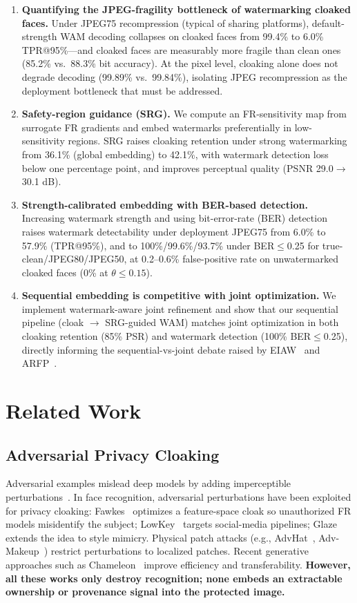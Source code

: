 \documentclass[preprint,12pt]{elsarticle}
\begin{document}
\begin{enumerate}
\item \textbf{Quantifying the JPEG-fragility bottleneck of watermarking cloaked faces.} Under JPEG75 recompression (typical of sharing platforms), default-strength WAM decoding collapses on cloaked faces from 99.4\% to 6.0\% TPR@95\%---and cloaked faces are measurably more fragile than clean ones (85.2\% vs.\ 88.3\% bit accuracy). At the pixel level, cloaking alone does not degrade decoding (99.89\% vs.\ 99.84\%), isolating JPEG recompression as the deployment bottleneck that must be addressed.
\item \textbf{Safety-region guidance (SRG).} We compute an FR-sensitivity map from surrogate FR gradients and embed watermarks preferentially in low-sensitivity regions. SRG raises cloaking retention under strong watermarking from 36.1\% (global embedding) to 42.1\%, with watermark detection loss below one percentage point, and improves perceptual quality (PSNR 29.0$\rightarrow$30.1 dB).
\item \textbf{Strength-calibrated embedding with BER-based detection.} Increasing watermark strength and using bit-error-rate (BER) detection raises watermark detectability under deployment JPEG75 from 6.0\% to 57.9\% (TPR@95\%), and to 100\%/99.6\%/93.7\% under BER$\le$0.25 for true-clean/JPEG80/JPEG50, at 0.2--0.6\% false-positive rate on unwatermarked cloaked faces (0\% at $\theta\le0.15$).
\item \textbf{Sequential embedding is competitive with joint optimization.} We implement watermark-aware joint refinement and show that our sequential pipeline (cloak $\rightarrow$ SRG-guided WAM) matches joint optimization in both cloaking retention (85\% PSR) and watermark detection (100\% BER$\le$0.25), directly informing the sequential-vs-joint debate raised by EIAW~\cite{liu2026eiaw} and ARFP~\cite{zhang2026arfp}.
\end{enumerate}

\section{Related Work}
\label{sec:related}

\subsection{Adversarial Privacy Cloaking}
Adversarial examples mislead deep models by adding imperceptible perturbations~\cite{szegedy2014intriguing,madry2018towards}. In face recognition, adversarial perturbations have been exploited for privacy cloaking: Fawkes~\cite{shan2020fawkes} optimizes a feature-space cloak so unauthorized FR models misidentify the subject; LowKey~\cite{zhou2021lowkey} targets social-media pipelines; Glaze~\cite{shan2024glaze} extends the idea to style mimicry. Physical patch attacks (e.g., AdvHat~\cite{komkov2021advhat}, Adv-Makeup~\cite{zhu2021advmakeup}) restrict perturbations to localized patches. Recent generative approaches such as Chameleon~\cite{li2024chameleon} improve efficiency and transferability. \textbf{However, all these works only destroy recognition; none embeds an extractable ownership or provenance signal into the protected image.}
\end{document}
